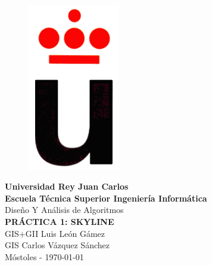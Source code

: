 \setlength{\unitlength}{1 cm} %
\thispagestyle{empty}
\begin{figure}[htb]
\begin{center}
\includegraphics[width=4cm]{./logoURJC.gif}
\end{center}
\end{figure}
\begin{center}
\textbf{{\Huge Universidad Rey Juan Carlos}\\[0.5cm]
{\LARGE Escuela Técnica Superior Ingeniería Informática}}\\[1.25cm]
{\Large Diseño Y Análisis de Algoritmos}\\[2.3cm]
{\LARGE \textbf{ PRÁCTICA 1: SKYLINE}}\\[3cm]
{\large GIS+GII Luis León Gámez}\\[1cm]
{\large GIS Carlos Vázquez Sánchez}\\[1cm]
Móstoles - \today
\end{center}
